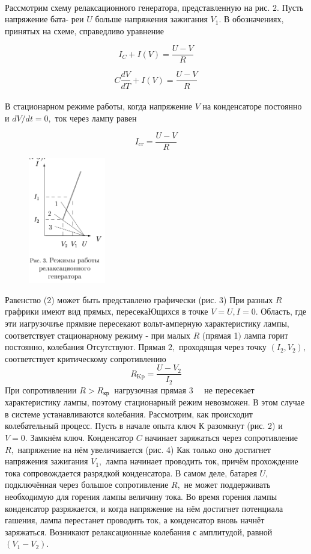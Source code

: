 \\

Рассмотрим схему релаксационного генератора, представленную на рис. $2 .$ Пусть напряжение бата- реи $U$ больше напряжения зажигания $V_{1} .$ В обозначениях, принятых на схеме, справедливо уравнение

$$I_{C}+I(V)=\frac{U-V}{R}$$

$$C \frac{d V}{d T}+I(V)=\frac{U-V}{R}$$
\\

В стационарном режиме работы, когда напряжение $V$ на конденсаторе постоянно и $d V / d t=0,$ ток через лампу равен

$$I_{\mathrm{cr}}=\frac{U-V}{R}$$

\begin{figure} 
\begin{center}
\includegraphics[width=0.3\textwidth]{3.PNG} 
\end{center}
\end{figure}

Равенство (2) может быть представлено графически (рис. 3) При разных $R$ графрики имеют вид прямых, пересекаЮщихся в точке $V=U, I=0 .$ Область, где эти иагрузочиъе прямвие пересекают вольт-амперную характеристику лампы, соответствует стационарному режиму - при малых $R$ (прямая 1$)$ лампа горит постоянно, колебания Отсутствуют. Прямая $2,$ проходящая через точку $\left(I_{2}, V_{2}\right),$ соответствует критическому сопротивлению
$$
R_{\mathrm{Kp}}=\frac{U-V_{2}}{I_{2}}
$$
При сопротивлении $R>R_{\text {кр }}$ нагрузочная прямая $3 \quad$ не пересекает характеристику лампы, поэтому стационарный режим невозможен. В этом случае в системе устанавливаются колебания. Рассмотрим, как происходит колебательный процесс. Пусть в начале опыта ключ К разомкнут (рис. 2) и $V=0 .$ Замкнём ключ. Конденсатор $C$ начинает заряжаться через сопротивление $R,$ напряжение на нём увеличивается (рис. 4) Как только оно достигнет напряжения зажигания $V_{1},$ лампа начинает проводить ток, причём прохождение тока сопровождается разрядкой конденсатора. В самом деле, батарея $U,$ подключённая через большое сопротивление $R,$ не может поддерживать необходимую для горения лампы величину тока. Во время горения лампы конденсатор разряжается, и когда напряжение на нём достигнет потенциала гашения, лампа перестанет проводить ток, а конденсатор вновь начнёт заряжаться. Возникают релаксационные колебания с амплитудой, равной $\left(V_{1}-V_{2}\right) .$

